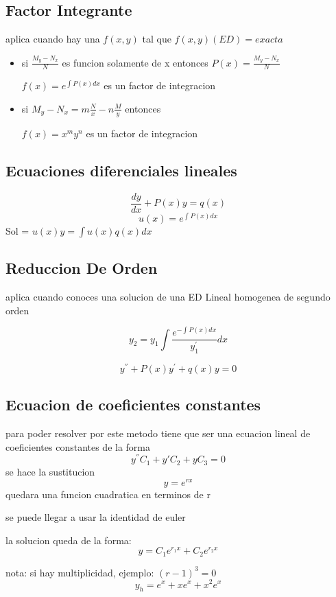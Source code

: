 \subsection{Factor Integrante}
aplica cuando hay una $f(x,y) $ tal que $f(x,y)(ED) = exacta$

\begin{itemize}
	\item si $ \frac{M_y - N_x}{N}$ es funcion solamente de x entonces $P(x) = \frac{M_y - N_x}{N}$
		\begin{center}
	$f(x) = e^{\int P(x)dx}$ es un factor de integracion
		\end{center}

	\item si $M_y - N_x = m\frac{N}{x} - n\frac{M}{y}$ entonces
		\begin{center}
			$f(x) = x^my^n$ es un factor de integracion
		\end{center}

\end{itemize}

\subsection{Ecuaciones diferenciales lineales}
$$\frac{dy}{dx} + P(x)y = q(x) $$
$$u(x) = e^{\int P(x) dx }$$
Sol =  $u(x)y = \int u(x)q(x)dx$


\subsection{Reduccion De Orden}
aplica cuando conoces una solucion de una ED Lineal homogenea de segundo orden

$$y_2 = y_1 \int \frac{e^{- \int P(x) dx }}{y_1^{'}} dx $$

$$y^{''} + P(x)y^{'} + q(x)y = 0$$
\subsection{Ecuacion de coeficientes constantes}
para poder resolver por este metodo tiene que ser una ecuacion lineal de coeficientes constantes
de la forma $$y^{''}C_1 + y{'}C_2 + yC_3 = 0$$
se hace la sustitucion $$y=e^{rx}$$ quedara una funcion cuadratica en terminos de r

se puede llegar a usar la identidad de euler

la solucion queda de la forma:
$$y=C_1e^{r_1x} + C_2e^{r_2x}$$


nota:
si hay multiplicidad, ejemplo: $(r-1)^3 = 0 $
$$y_h = e^x + xe^x + x^2e^x$$

